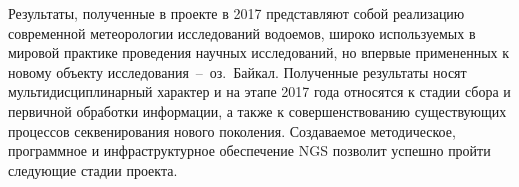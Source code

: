\documentclass[a4paper,12pt,openany,final]{extreport}
\newcommand\theyear{2017}
\begin{document}

Результаты, полученные в проекте в \theyear{} представляют собой реализацию современной метеорологии исследований водоемов, широко используемых в мировой практике проведения научных исследований, но впервые примененных к новому объекту исследования~--~оз.~Байкал.  Полученные результаты носят мультидисциплинарный характер и на этапе \theyear{} года относятся к стадии сбора и первичной обработки информации, а также к совершенствованию существующих процессов секвенирования нового поколения. Создаваемое методическое, программное и инфраструктурное обеспечение NGS позволит успешно пройти следующие стадии проекта.

\appendices
\end{document}
